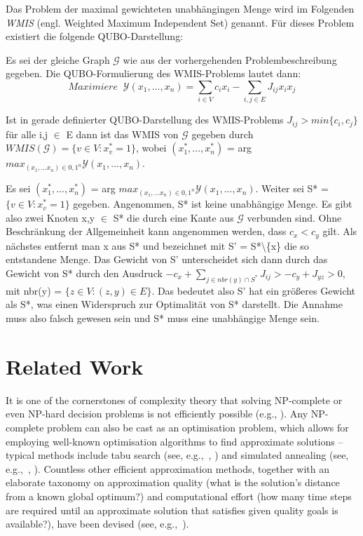 \documentclass[runningheads]{llncs}
\begin{document}
\noindent
Das Problem der maximal gewichteten unabhängingen Menge wird im Folgenden \emph{WMIS} (engl. Weighted Maximum Independent Set) genannt. Für dieses Problem existiert die folgende QUBO-Darstellung:

Es sei der gleiche Graph $\mathcal{G}$ wie aus der vorhergehenden Problembeschreibung gegeben. Die QUBO-Formulierung des WMIS-Problems lautet dann:
\begin{equation}\label{wmis:qubo}
Maximiere \;\;\mathcal{Y}(x_{1},...,x_{n}) = \sum_{i \in V}c_{i}x_{i} - \sum_{i,j \in E}J_{ij}x_{i}x_{j}
\end{equation}


Ist in gerade definierter QUBO-Darstellung des WMIS-Problems $J_{ij} > min \{c_{i},c_{j}\}$ für alle i,j $\in$ E dann ist das WMIS von $\mathcal{G}$ gegeben durch $WMIS(\mathcal{G})=\{v \in V: x^*_{v}=1\}$, wobei $(x^*_{1},...,x^*_{n})$ = arg $max_{(x_{1},...x_{n})\in{0,1}^n} \mathcal{Y}(x_{1},...,x_{n}).$

Es sei  $(x^*_{1},...,x^*_{n})$ = arg $max_{(x_{1},...x_{n})\in{0,1}^n} \mathcal{Y}(x_{1},...,x_{n})$. Weiter sei S* = $\{v \in V: x^*_{v}=1\}$ gegeben. Angenommen, S* ist keine unabhängige Menge. Es gibt also zwei Knoten x,y $\in$ S* die durch eine Kante aus $\mathcal{G}$ verbunden sind. Ohne Beschränkung der Allgemeinheit kann angenommen werden, dass $c_{x} < c_{y}$ gilt. Als nächstes entfernt man x aus S* und bezeichnet mit S' = S*\textbackslash\{x\} die so entstandene Menge. Das Gewicht von S' unterscheidet sich dann durch das Gewicht von S* durch den Ausdruck $-c_{x} + \sum_{j \in nbr(y) \cap S^*}J_{ij} > -c_{y} + J_{yz} > 0$, mit nbr(y) = $\{ z \in V: (z,y) \in E\}$. Das bedeutet also S' hat ein größeres Gewicht als S*, was einen Widerspruch zur Optimalität von S* darstellt. Die Annahme muss also falsch gewesen sein und S* muss eine unabhängige Menge sein. 


\section{Related Work}
It is one of the cornerstones of complexity theory that solving NP-complete or even NP-hard decision problems is not efficiently possible (e.g., \cite{cook1971complexity,murty1987some}). Any NP-complete problem can also be cast as an optimisation problem, which allows for employing well-known optimisation algorithms to find approximate solutions -- typical methods include tabu search (see, e.g.,~\cite{glover2013tabu}, \cite{gendreau1994tabu}) and simulated annealing (see, e.g.,~\cite{kirkpatrick1983optimization}, \cite{chen1995chaotic}). Countless other efficient approximation methods, together with an elaborate taxonomy on approximation quality (what is the solution's distance from a known global optimum?) and computational effort (how many time steps are required until an approximate solution that satisfies given quality goals is available?), have been devised (see, e.g.,~\cite{NPO-Compendium}).
\end{document}
